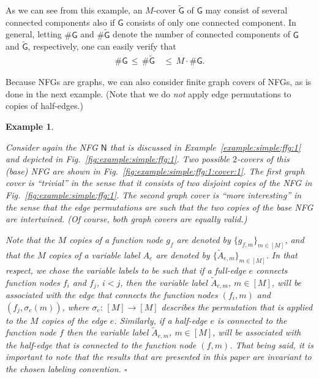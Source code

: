 \documentclass[journal, twocolumn]{IEEEtran}
\renewcommand{\leq}{\leqslant}
\newcommand{\graph}[1]{\mathsf{#1}}
\newcommand{\graphN}{\graph{N}}
\newcommand{\cover}[1]{\tilde{#1}}
\newcommand{\cgraph}[1]{\cover{\graph{#1}}}
\newcommand{\?}{\mathrm{?}}
\newcommand{\qedwhite}{\hspace*{\fill}%
  $\square$\smallskip}
\newcommand{\exampleend}{\qedwhite}
\newtheorem{Example}[Lemma]{Example}
\newcommand{\ncomponents}{\#}
\begin{document}
As we can see from this example, an $M$-cover $\cgraph{G}$ of $\graph{G}$ may
consist of several connected components also if $\graph{G}$ consists of only
one connected component. In general, letting $\ncomponents\graph{G}$ and
$\ncomponents\cgraph{G}$ denote the number of connected components of
$\graph{G}$ and $\cgraph{G}$, respectively, one can easily verify that
\begin{align}
  \ncomponents\graph{G}
     \,\leq\, 
       \ncomponents\cgraph{G}
    &\,\leq\, 
       M
         \!\cdot\!
         \ncomponents\graph{G}.
           \label{eq:ncomponents:inequalities:1}
\end{align}


Because NFGs are graphs, we can also consider finite graph covers of NFGs, as
is done in the next example. (Note that we do \emph{not} apply edge
permutations to copies of half-edges.)


\begin{Example}
  \label{example:simple:ffg:1:cont:1}

  Consider again the NFG $\graphN$ that is discussed in
  Example~\ref{example:simple:ffg:1} and depicted in
  Fig.~\ref{fig:example:simple:ffg:1}. Two possible $2$-covers of this
  (base) NFG are shown in Fig.~\ref{fig:example:simple:ffg:1:cover:1}. The
  first graph cover is ``trivial'' in the sense that it consists of two
  disjoint copies of the NFG in Fig.~\ref{fig:example:simple:ffg:1}. The
  second graph cover is ``more interesting'' in the sense that the edge
  permutations are such that the two copies of the base NFG are
  intertwined. (Of course, both graph covers are equally valid.)

  Note that the $M$ copies of a function node $g_f$ are denoted by $\{ g_{f,m}
  \}_{m \in [M]}$, and that the $M$ copies of a variable label $A_e$ are
  denoted by $\{ \cover{A}_{e,m} \}_{m \in [M]}$. In that respect, we chose
  the variable labels to be such that if a full-edge $e$ connects function
  nodes $f_i$ and $f_j$, $i < j$, then the variable label $\cover{A}_{e,m}$,
  $m \in [M]$, will be associated with the edge that connects the function
  nodes $(f_i,m)$ and $(f_j,\sigma_e(m))$, where $\sigma_e: \, [M] \to [M]$
  describes the permutation that is applied to the $M$ copies of the edge
  $e$. Similarly, if a half-edge $e$ is connected to the function node $f$
  then the variable label $\cover{A}_{e,m}$, $m \in [M]$, will be associated
  with the half-edge that is connected to the function node $(f,m)$. That
  being said, it is important to note that the results that are presented in
  this paper are invariant to the chosen labeling convention.  \exampleend
\end{Example}
\end{document}
